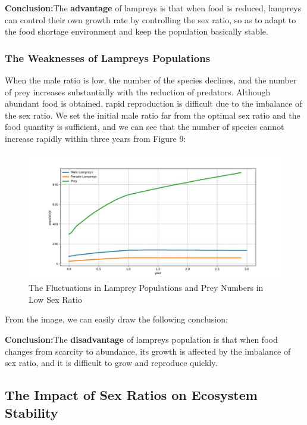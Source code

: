 \documentclass[12pt]{article}  %
\begin{document}
\textbf{Conclusion:}The\textbf{ advantage} of lampreys is that when food is reduced, lampreys can control their own growth rate by controlling the sex ratio, so as to adapt to the food shortage environment and keep the population basically stable.

\subsubsection{The Weaknesses of Lampreys Populations}

When the male ratio is low, the number of the species declines, and the number of prey increases substantially with the reduction of predators.  Although abundant food is obtained, rapid reproduction is difficult due to the imbalance of the sex ratio.  We set the initial male ratio far from the optimal sex ratio and the food quantity is sufficient, and we can see that the number of species cannot increase rapidly within three years from Figure 9:

\begin{figure}[H] %
	\centering  %
	\includegraphics[width=.6\textwidth]{模拟2.jpg} %
	\caption{The Fluctuations in  Lamprey Populations and Prey Numbers in Low Sex Ratio}
\end{figure}
\vspace{-0.8cm}
From the image, we can easily draw the following conclusion: 

\textbf{Conclusion:}The \textbf{disadvantage} of lampreys population is that when food changes from scarcity to abundance, its growth is affected by the imbalance of sex ratio, and it is difficult to grow and reproduce quickly.
\subsection{The Impact of Sex Ratios on Ecosystem Stability}
\end{document}
